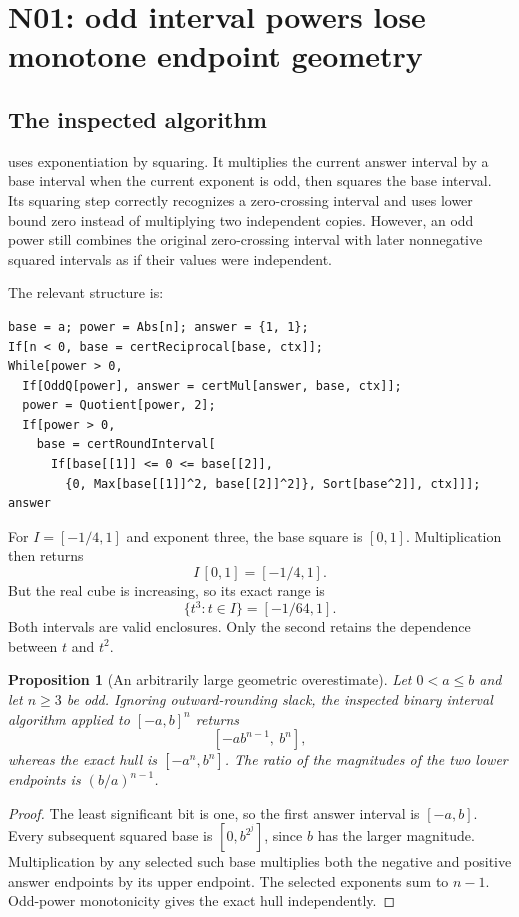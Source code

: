 \documentclass[11pt,letterpaper]{article}
\newcommand{\code}[1]{\texttt{\detokenize{#1}}}
\newtheorem{proposition}{Proposition}[section]
\begin{document}
\section{N01: odd interval powers lose monotone endpoint geometry}
\label{sec:power}
\subsection{The inspected algorithm}

\code{certIntegerPower} uses exponentiation by squaring. It multiplies the current answer interval by a base interval when the current exponent is odd, then squares the base interval. Its squaring step correctly recognizes a zero-crossing interval and uses lower bound zero instead of multiplying two independent copies. However, an odd power still combines the original zero-crossing interval with later nonnegative squared intervals as if their values were independent.\cite{cert}

The relevant structure is:
\begin{lstlisting}
base = a; power = Abs[n]; answer = {1, 1};
If[n < 0, base = certReciprocal[base, ctx]];
While[power > 0,
  If[OddQ[power], answer = certMul[answer, base, ctx]];
  power = Quotient[power, 2];
  If[power > 0,
    base = certRoundInterval[
      If[base[[1]] <= 0 <= base[[2]],
        {0, Max[base[[1]]^2, base[[2]]^2]}, Sort[base^2]], ctx]]];
answer
\end{lstlisting}

For $I=[-1/4,1]$ and exponent three, the base square is $[0,1]$. Multiplication then returns
\[
 I\,[0,1]=[-1/4,1].
\]
But the real cube is increasing, so its exact range is
\[
 \{t^3:t\in I\}=[-1/64,1].
\]
Both intervals are valid enclosures. Only the second retains the dependence between $t$ and $t^2$.

\begin{proposition}[An arbitrarily large geometric overestimate]
Let $0<a\le b$ and let $n\ge3$ be odd. Ignoring outward-rounding slack, the inspected binary interval algorithm applied to $[-a,b]^n$ returns
\[
 [-a b^{n-1},\ b^n],
\]
whereas the exact hull is $[-a^n,b^n]$. The ratio of the magnitudes of the two lower endpoints is $(b/a)^{n-1}$.
\end{proposition}
\begin{proof}
The least significant bit is one, so the first answer interval is $[-a,b]$. Every subsequent squared base is $[0,b^{2^j}]$, since $b$ has the larger magnitude. Multiplication by any selected such base multiplies both the negative and positive answer endpoints by its upper endpoint. The selected exponents sum to $n-1$. Odd-power monotonicity gives the exact hull independently.
\end{proof}
\end{document}
